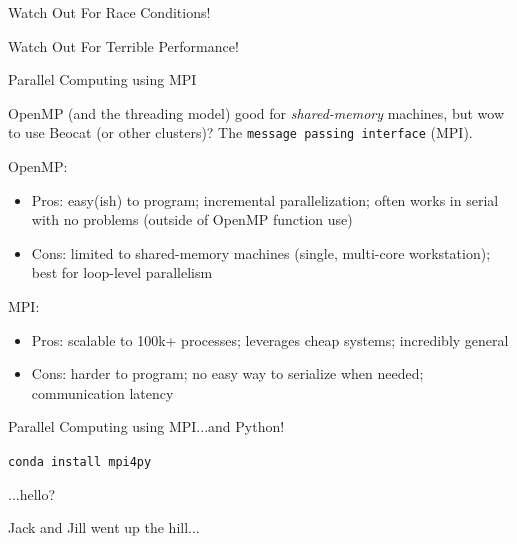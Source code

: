 \documentclass[10pt]{beamer}
\begin{document}
\begin{frame}{Watch Out For Race Conditions!}



\end{frame}


\begin{frame}{Watch Out For Terrible Performance!}



\end{frame}


\begin{frame}{Parallel Computing using MPI}

OpenMP (and the threading model) good for {\it shared-memory} machines, but
wow to use Beocat (or other clusters)? The {\tt message passing interface} (MPI).
\vfill 

OpenMP:
\begin{itemize}
 \item Pros: easy(ish) to program; incremental parallelization; often works in serial with no problems (outside of OpenMP function use)
 \item Cons: limited to shared-memory machines (single, multi-core workstation); best for loop-level parallelism
\end{itemize}

MPI:
\begin{itemize}
 \item Pros: scalable to 100k+ processes; leverages cheap systems; incredibly general 
 \item Cons: harder to program; no easy way to serialize when needed; communication latency
\end{itemize}

\end{frame}

\begin{frame}{Parallel Computing using MPI...and Python!}

{\tt conda install mpi4py}

\end{frame}

\begin{frame}{...hello?}



\end{frame}

\begin{frame}{Jack and Jill went up the hill...}



\end{frame}
\end{document}
